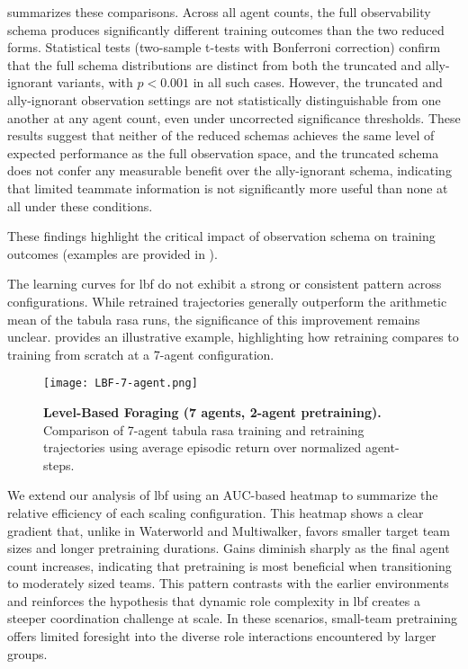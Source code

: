  summarizes these comparisons. 
Across all agent counts, the full observability schema produces 
significantly different training outcomes than the two reduced forms. 
Statistical tests (two-sample t-tests with Bonferroni correction) 
confirm that the full schema distributions are distinct from both the 
truncated and ally-ignorant variants, with $p < 0.001$ in all such cases. 
However, the truncated and ally-ignorant observation settings are not 
statistically distinguishable from one another at any agent count, 
even under uncorrected significance thresholds. 
These results suggest that neither of 
the reduced schemas achieves the same level of 
expected performance as the full observation space, 
and the truncated schema does not confer any measurable 
benefit over the ally-ignorant schema, indicating 
that limited teammate information is not significantly 
more useful than none at all under these conditions.

These findings highlight the critical impact of observation schema on training outcomes
(examples are provided in ).

The learning curves for \gls{lbf} do not exhibit a strong or consistent 
pattern across configurations. While retrained trajectories 
generally outperform the arithmetic mean of the tabula rasa runs, 
the significance of this improvement remains unclear. 
 provides an illustrative example, highlighting how 
retraining compares to training from scratch at a 7-agent configuration.

\begin{figure}[!ht]
    \centering
    \texttt{[image: LBF-7-agent.png]}
    \caption{\textbf{Level-Based Foraging (7 agents, 2-agent pretraining).} Comparison of 
    7-agent tabula rasa training and retraining trajectories using average 
    episodic return over normalized agent-steps.}
    \label{con1:fig:lbf-7}
\end{figure}

We extend our analysis of \gls{lbf} using an AUC-based heatmap to summarize the 
relative efficiency of each scaling configuration. 
This heatmap shows a clear gradient that, unlike in Waterworld and Multiwalker, 
favors smaller target team sizes and longer pretraining durations. 
Gains diminish sharply as the final agent count increases, 
indicating that pretraining is most beneficial when transitioning to moderately sized teams. 
This pattern contrasts with the earlier environments and reinforces the hypothesis that 
dynamic role complexity in \gls{lbf} creates a steeper coordination challenge at scale. 
In these scenarios, small-team pretraining offers limited foresight into the diverse role 
interactions encountered by larger groups.


